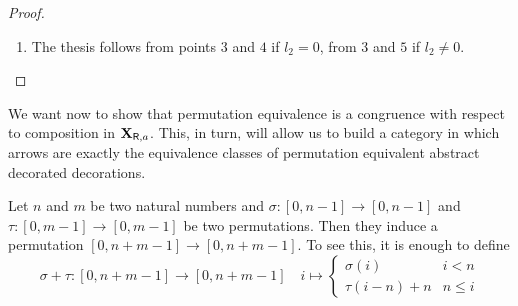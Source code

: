 \begin{proof}
\begin{enumerate}
			\item  The thesis follows from points $3$ and $4$ if $l_2=0$, from $3$ and $5$ if $l_2\neq 0$.	\qedhere
	\end{enumerate}
\end{proof}


We want now to show that permutation equivalence is a congruence with respect to composition in $\textbf {\textup{X}}_{\mathsf{R}, a}$. This, in turn, will allow us to build  a category in which arrows are exactly the equivalence classes of permutation equivalent abstract decorated decorations.


\begin{remark}\label{rem:sum}
	Let $n$ and $m$ be two natural numbers and $\sigma\colon [0, n-1]\to [0,n-1]$ and $\tau\colon [0, m-1]\to [0,m-1]$ be two permutations. Then they induce a permutation $[0, n+m-1]\to [0, n+m-1]$. To see this, it is enough to define
		\[\sigma+\tau\colon[0, n+m-1]\to[0, n+m-1] \quad i \mapsto \begin{cases}
		\sigma(i) & i < n\\
		\tau(i-n) + n &  n\leq i 
	\end{cases}\]
\end{remark}



